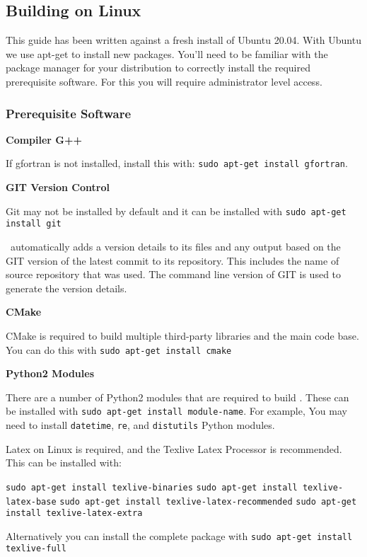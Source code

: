 \subsection{Building on Linux}

This guide has been written against a fresh install of Ubuntu 20.04. With Ubuntu we use apt-get to install new packages. You’ll need to be familiar with the package manager for your distribution to correctly install the required prerequisite software. For this you will require administrator level access.

\subsubsection{Prerequisite Software}

\textbf{Compiler G++}

If gfortran is not installed, install this with: \texttt{sudo apt-get install gfortran}.

\textbf{GIT Version Control}

Git may not be installed by default and it can be installed with \texttt{sudo apt-get install git}

\CNAME\ automatically adds a version details to its files and any output based on the GIT version of the latest commit to its repository. This includes the name of source repository that was used. The command line version of GIT is used  to generate the version details.

\textbf{CMake}

CMake is required to build multiple third-party libraries and the main code base. You can do this with \texttt{sudo apt-get install cmake}

\textbf{Python2 Modules}

There are a number of Python2 modules that are required to build \CNAME. These can be installed with \texttt{sudo apt-get install \texttt{module-name}}. For example, You may need to install \texttt{datetime}, \texttt{re}, and \texttt{distutils} Python modules. 

Latex on Linux is required, and the Texlive Latex Processor is recommended. This can be installed with:

\texttt{sudo apt-get install texlive-binaries}
\texttt{sudo apt-get install texlive-latex-base}
\texttt{sudo apt-get install texlive-latex-recommended}
\texttt{sudo apt-get install texlive-latex-extra}

Alternatively you can install the complete package with 
\texttt{sudo apt-get install texlive-full}

